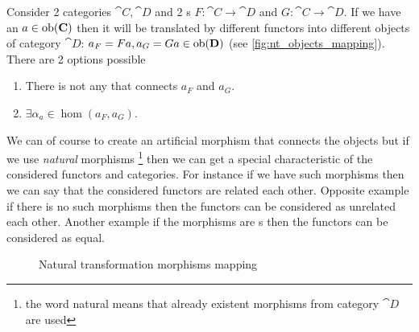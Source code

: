 Consider 2 categories $\cat{C}, \cat{D}$ and 2
s $F: \cat{C} \to \cat{D}$ and $G: \cat{C} \to
\cat{D}$. If we have an  $a \in \mathrm{ob}(\mathbf{C})$ then
it will be translated by different functors into different objects of
category $\cat{D}$: $a_F = F a, a_G = G a \in \mathrm{ob}(\mathbf{D})$ (see
\cref{fig:nt_objects_mapping}). There are 2 options possible
\begin{enumerate}
\item There is not  any  that connects $a_F$
  and $a_G$.
\item $\exists \alpha_a \in \hom\left(a_F, a_G\right)$.
\end{enumerate}
We can of course to create an artificial morphism that connects the
objects but if we use \textit{natural} morphisms 
\footnote{the word natural means that already existent morphisms from
  category $\cat{D}$ are used}
then we can get a
special characteristic of the considered functors and categories. For
instance if we have such morphisms then we can say that the
considered functors are related each other. Opposite example if there
is no such morphisms then the functors can be considered as unrelated
each other. Another example if the
morphisms are s then the functors can be
considered as equal.

\begin{figure}
  \centering
  \caption{Natural transformation morphisms mapping}
  \label{fig:nt_morphisms_mapping}
\end{figure}


